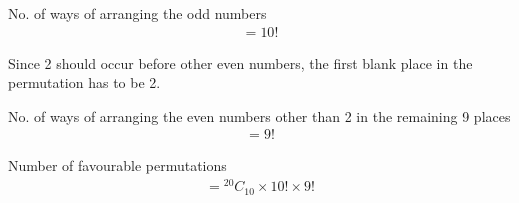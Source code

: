 \documentclass[journal,12pt,twocolumn]{IEEEtran}
\begin{document}
No. of ways of arranging the odd numbers 
\begin{align}
    = 10!
\end{align}

Since 2 should occur before other even numbers, the first blank place in the permutation has to be 2.\newline

No. of ways of arranging the even numbers other than 2 in the remaining 9 places 
\begin{align}
    = 9!
\end{align}

Number of favourable permutations 
\begin{align}
    = {}^{20}C_{10}\times10!\times9!\\\nonumber
\end{align}
\end{document}
